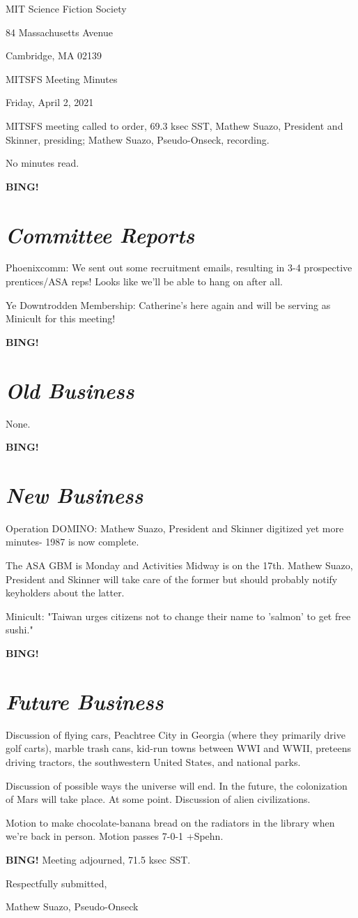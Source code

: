 \documentclass[10pt]{article}
\newcommand{\bing}{{\bf BING!} }
\newcommand{\goto}[1]{\bing \vskip 12pt \section*{{\em{#1}}}}
\newcommand{\skinner}{Mathew Suazo, President and Skinner\xspace}
\newcommand{\onseck}{Mathew Suazo, Pseudo-Onseck\xspace}
\newcommand{\meetingdate}{Friday, April 2, 2021}
\begin{document}
\begin{center}

MIT Science Fiction Society

84 Massachusetts Avenue

Cambridge, MA 02139

\vspace{12pt}

MITSFS Meeting Minutes

\meetingdate

\end{center}

\vspace{18pt}

\setlength{\parskip}{6pt}

\noindent
MITSFS meeting called to order, 69.3 ksec SST,
\skinner, presiding; \onseck, recording.

No minutes read.

\goto{Committee Reports}

Phoenixcomm: We sent out some recruitment emails, resulting in 3-4 prospective prentices/ASA reps! Looks like we'll be able to hang on after all.

Ye Downtrodden Membership: Catherine's here again and will be serving as Minicult for this meeting!

\goto{Old Business}

None.

\goto{New Business}

Operation DOMINO: \skinner digitized yet more minutes- 1987 is now complete.

The ASA GBM is Monday and Activities Midway is on the 17th. \skinner will take care of the former but should probably notify keyholders about the latter.

Minicult: "Taiwan urges citizens not to change their name to 'salmon' to get free sushi."

\goto{Future Business}

Discussion of flying cars, Peachtree City in Georgia (where they primarily drive golf carts), marble trash cans, kid-run towns between WWI and WWII, preteens driving tractors, the southwestern United States, and national parks.

Discussion of possible ways the universe will end. In the future, the colonization of Mars will take place. At some point. Discussion of alien civilizations. 

Motion to make chocolate-banana bread on the radiators in the library when we're back in person. Motion passes 7-0-1 +Spehn.

\bing
\noindent
Meeting adjourned, 71.5 ksec SST.

\vspace{18pt}

\centerline{Respectfully submitted,}
\centerline{\onseck}
\end{document}
